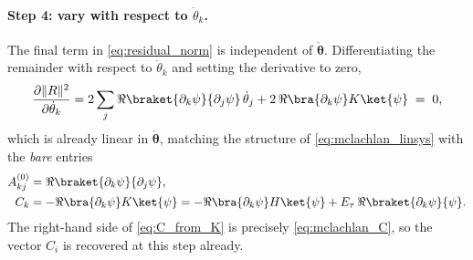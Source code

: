 \paragraph{Step 4: vary with respect to $\dot{\theta}_k$.}
The final term in \cref{eq:residual_norm} is independent of
$\dot{\bm{\theta}}$. Differentiating the remainder with respect to
$\dot{\theta}_k$ and setting the derivative to zero,
\begin{equation}
  \label{eq:mclachlan_variation}
  \frac{\partial\|R\|^{2}}{\partial\dot{\theta}_k}
  = 2\sum_j \Re\braket{\partial_k\psi}{\partial_j\psi}\,\dot{\theta}_j
    + 2\,\Re\bra{\partial_k\psi}K\ket{\psi}
  \;=\; 0,
\end{equation}
which is already linear in $\dot{\bm{\theta}}$, matching the structure
of \cref{eq:mclachlan_linsys} with the \emph{bare} entries
\begin{align}
  A^{(0)}_{kj} &= \Re\braket{\partial_k\psi}{\partial_j\psi},
  \label{eq:A_bare}\\
  C_k &= -\Re\bra{\partial_k\psi}K\ket{\psi}
       = -\Re\bra{\partial_k\psi}H\ket{\psi}
         + E_\tau\,\Re\braket{\partial_k\psi}{\psi}.
  \label{eq:C_from_K}
\end{align}
The right-hand side of \cref{eq:C_from_K} is precisely
\cref{eq:mclachlan_C}, so the vector $C_i$ is recovered at this step
already.

